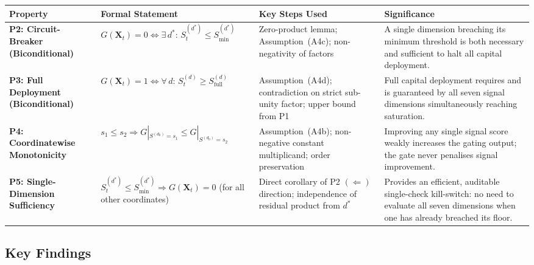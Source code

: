 \documentclass[12pt,openany]{book}
\numberwithin{equation}{chapter}
\theoremstyle{plain}
\theoremstyle{definition}
\theoremstyle{remark}
\renewcommand{\arraystretch}{1.2}
\def\mathcal#1{#1}%
\begin{document}
\begin{center}
\renewcommand{\arraystretch}{1.5}
\begin{tabularx}{\linewidth}{@{}
  >{\small\bfseries\RaggedRight}p{3.5cm}
  >{\raggedright\arraybackslash}p{4.0cm}
  >{\raggedright\arraybackslash}p{3.5cm}
  >{\raggedright\arraybackslash}X
  @{}}
\toprule
\textbf{Property} &
\textbf{Formal Statement} &
\textbf{Key Steps Used} &
\textbf{Significance} \\
\midrule
P2: Circuit-Breaker
(Biconditional) &
$G(\mathbf{X}_t)=0
 \Leftrightarrow
 \exists\,d^*\!:\,
 \mathcal{S}_t^{(d^*)}\!\leq\!
 \mathcal{S}_{\min}^{(d^*)}$ &
Zero-product lemma;
Assumption~(A4c);
non-negativity of factors &
A single dimension breaching its
minimum threshold is both necessary
and sufficient to halt all capital
deployment. \\
\addlinespace
P3: Full Deployment
(Biconditional) &
$G(\mathbf{X}_t)=1
 \Leftrightarrow
 \forall\,d\!:\,
 \mathcal{S}_t^{(d)}\!\geq\!
 \mathcal{S}_{\mathrm{full}}^{(d)}$ &
Assumption~(A4d);
contradiction on strict
sub-unity factor;
upper bound from P1 &
Full capital deployment requires and
is guaranteed by all seven
signal dimensions simultaneously
reaching saturation. \\
\addlinespace
P4: Coordinatewise
Monotonicity &
$s_1\!\leq\!s_2
 \Rightarrow
 G|_{\mathcal{S}^{(d_0)}=s_1}
 \!\leq\!
 G|_{\mathcal{S}^{(d_0)}=s_2}$ &
Assumption~(A4b);
non-negative constant
multiplicand; order
preservation &
Improving any single signal score
weakly increases the gating
output; the gate never penalises
signal improvement. \\
\addlinespace
P5: Single-Dimension
Sufficiency &
$\mathcal{S}_t^{(d^*)}\!\leq\!
 \mathcal{S}_{\min}^{(d^*)}
 \Rightarrow
 G(\mathbf{X}_t)\!=\!0$
 (for all other coordinates) &
Direct corollary of P2
$(\Leftarrow)$ direction;
independence of residual
product from $d^*$ &
Provides an efficient, auditable
single-check kill-switch: no need
to evaluate all seven dimensions
when one has already breached its
floor. \\
\bottomrule
\end{tabularx}
\end{center}

\subsection{Key Findings}
\end{document}
